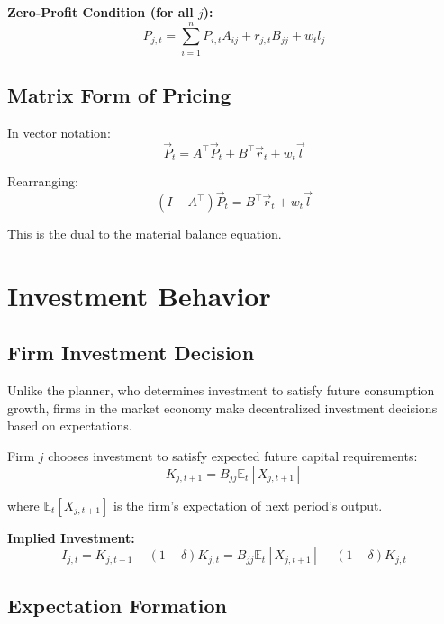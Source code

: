 \documentclass[12pt,a4paper]{article}
\theoremstyle{definition}
\theoremstyle{remark}
\newcommand{\E}{\mathbb{E}}
\begin{document}
\textbf{Zero-Profit Condition (for all $j$):}
\begin{equation}
    P_{j,t} = \sum_{i=1}^n P_{i,t} A_{ij} + r_{j,t} B_{jj} + w_t l_j
\end{equation}

\subsection{Matrix Form of Pricing}

In vector notation:
\begin{equation}
    \vec{P}_t = A^\top \vec{P}_t + B^\top \vec{r}_t + w_t \vec{l}
\end{equation}

Rearranging:
\begin{equation}
    (I - A^\top)\vec{P}_t = B^\top \vec{r}_t + w_t \vec{l}
\end{equation}

This is the dual to the material balance equation.

\section{Investment Behavior}

\subsection{Firm Investment Decision}

Unlike the planner, who determines investment to satisfy future consumption growth, firms in the market economy make decentralized investment decisions based on expectations.

Firm $j$ chooses investment to satisfy expected future capital requirements:
\begin{equation}
    K_{j,t+1} = B_{jj} \E_t[X_{j,t+1}]
\end{equation}

where $\E_t[X_{j,t+1}]$ is the firm's expectation of next period's output.

\textbf{Implied Investment:}
\begin{equation}
    I_{j,t} = K_{j,t+1} - (1-\delta)K_{j,t} = B_{jj}\E_t[X_{j,t+1}] - (1-\delta)K_{j,t}
\end{equation}

\subsection{Expectation Formation}
\end{document}
